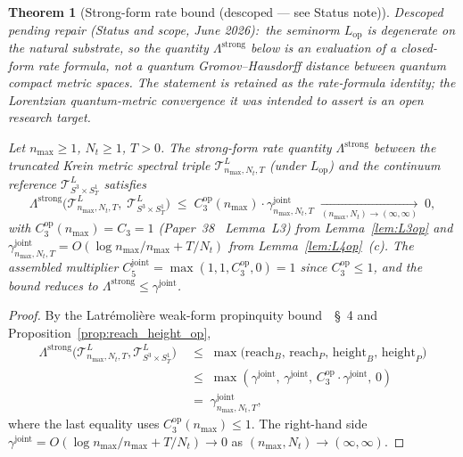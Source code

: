 \documentclass[11pt,a4paper]{article}
\theoremstyle{plain}
\newtheorem{theorem}{Theorem}[section]
\theoremstyle{definition}
\newcommand{\nmax}{n_{\max}}
\newcommand{\Nt}{N_{t}}
\newcommand{\Manifold}{S^{3}\times S^{1}_{T}}
\newcommand{\Tcal}{\mathcal{T}}
\newcommand{\Lprop}{\Lambda^{\mathrm{strong}}}
\newcommand{\Lop}{L_{\mathrm{op}}}
\newcommand{\gammajoint}{\gamma^{\mathrm{joint}}}
\newcommand{\Cthreeop}{C_{3}^{\mathrm{op}}}
\newcommand{\Cfivejoint}{C_{5}^{\mathrm{joint}}}
\begin{document}
\begin{theorem}[Strong-form rate bound (descoped --- see Status note)]
\label{thm:main}
\emph{Descoped pending repair (Status and scope, June 2026):\ the
seminorm $\Lop$ is degenerate on the natural substrate, so the quantity
$\Lprop$ below is an evaluation of a closed-form rate formula, not a
quantum Gromov--Hausdorff distance between quantum compact metric
spaces. The statement is retained as the rate-formula identity; the
Lorentzian quantum-metric convergence it was intended to assert is an
open research target.}

Let $\nmax \ge 1$, $\Nt \ge 1$, $T > 0$. The strong-form rate quantity
$\Lprop$ between the truncated Krein
metric spectral triple $\Tcal^{L}_{\nmax, \Nt, T}$ (under $\Lop$) and
the continuum reference $\Tcal^{L}_{\Manifold}$ satisfies
\begin{equation}\label{eq:main_bound_op}
   \Lprop\!\bigl(\Tcal^{L}_{\nmax, \Nt, T},\;
                 \Tcal^{L}_{\Manifold}\bigr)
   \;\le\; \Cthreeop(\nmax) \cdot \gammajoint_{\nmax, \Nt, T}
   \;\xrightarrow[(\nmax, \Nt) \to (\infty, \infty)]{}\; 0,
\end{equation}
with $\Cthreeop(\nmax) = C_{3} = 1$ (Paper~38~\cite{paper38} Lemma~L3) from
Lemma~\ref{lem:L3op} and $\gammajoint_{\nmax, \Nt, T}
= O(\log\nmax/\nmax + T/\Nt)$ from Lemma~\ref{lem:L4op}~(c).
The assembled multiplier $\Cfivejoint = \max(1, 1, \Cthreeop, 0) = 1$
since $\Cthreeop \le 1$, and the bound reduces to
$\Lprop \le \gammajoint$.
\end{theorem}

\begin{proof}
By the Latr\'emoli\`ere weak-form propinquity
bound~\cite{latremoliere_metric_st_2017}~\S~4 and
Proposition~\ref{prop:reach_height_op},
\begin{align*}
   \Lprop\!\bigl(\Tcal^{L}_{\nmax, \Nt, T}, \Tcal^{L}_{\Manifold}\bigr)
   \;&\le\; \max\bigl(\mathrm{reach}_{B},\,
                       \mathrm{reach}_{P},\,
                       \mathrm{height}_{B},\,
                       \mathrm{height}_{P}\bigr) \\
   \;&\le\; \max(\gammajoint,\, \gammajoint,\, \Cthreeop \cdot \gammajoint,\, 0) \\
   \;&=\; \gammajoint_{\nmax, \Nt, T},
\end{align*}
where the last equality uses $\Cthreeop(\nmax) \le 1$. The right-hand
side $\gammajoint = O(\log\nmax/\nmax + T/\Nt) \to 0$ as
$(\nmax, \Nt) \to (\infty, \infty)$. \qedhere
\end{proof}
\end{document}
